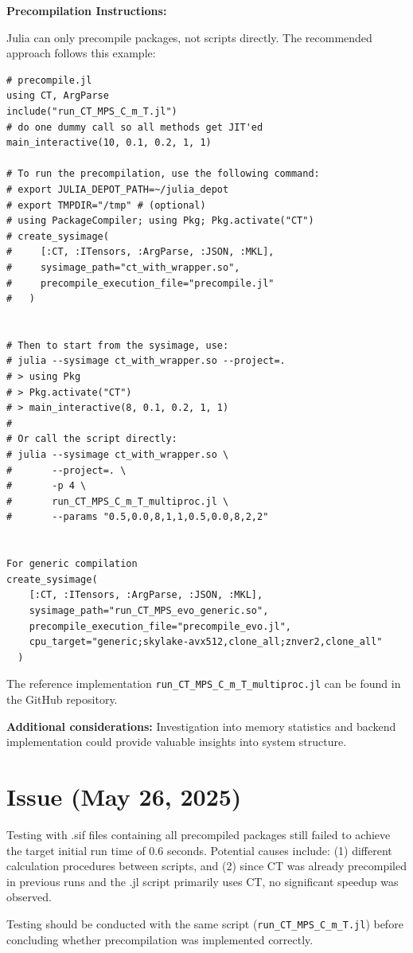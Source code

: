 \documentclass[11pt,a4paper]{article}
\begin{document}
\textbf{Precompilation Instructions:}

Julia can only precompile packages, not scripts directly. The recommended approach follows this example:

\begin{lstlisting}
# precompile.jl
using CT, ArgParse
include("run_CT_MPS_C_m_T.jl")
# do one dummy call so all methods get JIT'ed
main_interactive(10, 0.1, 0.2, 1, 1)
 
# To run the precompilation, use the following command:
# export JULIA_DEPOT_PATH=~/julia_depot
# export TMPDIR="/tmp" # (optional)
# using PackageCompiler; using Pkg; Pkg.activate("CT")
# create_sysimage(
#     [:CT, :ITensors, :ArgParse, :JSON, :MKL],
#     sysimage_path="ct_with_wrapper.so",
#     precompile_execution_file="precompile.jl"
#   )
 
 
# Then to start from the sysimage, use:
# julia --sysimage ct_with_wrapper.so --project=.
# > using Pkg
# > Pkg.activate("CT")
# > main_interactive(8, 0.1, 0.2, 1, 1)
#
# Or call the script directly:
# julia --sysimage ct_with_wrapper.so \
#       --project=. \
#       -p 4 \
#       run_CT_MPS_C_m_T_multiproc.jl \
#       --params "0.5,0.0,8,1,1,0.5,0.0,8,2,2"
 
 
For generic compilation
create_sysimage(
    [:CT, :ITensors, :ArgParse, :JSON, :MKL],
    sysimage_path="run_CT_MPS_evo_generic.so",
    precompile_execution_file="precompile_evo.jl",
    cpu_target="generic;skylake-avx512,clone_all;znver2,clone_all"
  )
\end{lstlisting}

The reference implementation \texttt{run\_CT\_MPS\_C\_m\_T\_multiproc.jl} can be found in the GitHub repository.

\textbf{Additional considerations:} Investigation into memory statistics and backend implementation could provide valuable insights into system structure.

\section{Issue (May 26, 2025)}

Testing with .sif files containing all precompiled packages still failed to achieve the target initial run time of 0.6 seconds. Potential causes include: (1) different calculation procedures between scripts, and (2) since CT was already precompiled in previous runs and the .jl script primarily uses CT, no significant speedup was observed.

Testing should be conducted with the same script (\texttt{run\_CT\_MPS\_C\_m\_T.jl}) before concluding whether precompilation was implemented correctly.
\end{document}
